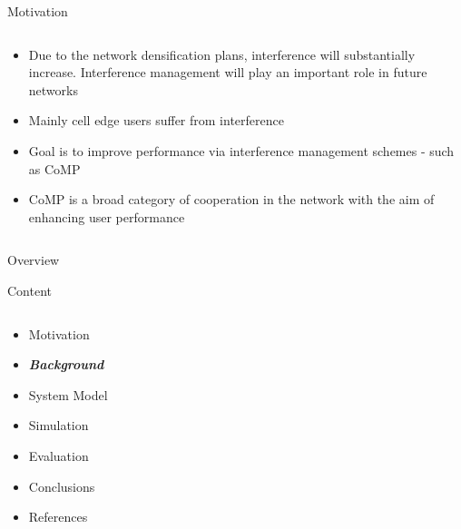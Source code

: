 \documentclass[xcolor={cmyk}]{beamer}
\begin{document}
 \begin{frame}{Motivation}
	 \begin{block}{}
	 	\begin{columns}
			\begin{column}{.9\textwidth}
				\begin{itemize}
					\item Due to the network densification plans, interference will substantially increase. Interference management will play an important role in future networks
					\item Mainly cell edge users suffer from interference
					\item Goal is to improve performance via interference management schemes - such as CoMP 
					\item CoMP is a broad category of cooperation in the network with the aim of enhancing user performance
				\end{itemize}
			\end{column}
		\end{columns}
	 \end{block}
 \end{frame}
 
\begin{frame}{Overview}
	\begin{block}{Content}
		\begin{columns}
			\begin{column}{.9\textwidth}
				\begin{itemize}
					\item Motivation
					\item \textbf{\emph{Background}}
					\item System Model
					\item Simulation
					\item Evaluation
					\item Conclusions
					\item References
				\end{itemize}
			\end{column}
		\end{columns}
	\end{block}
\end{frame}


\end{document}
